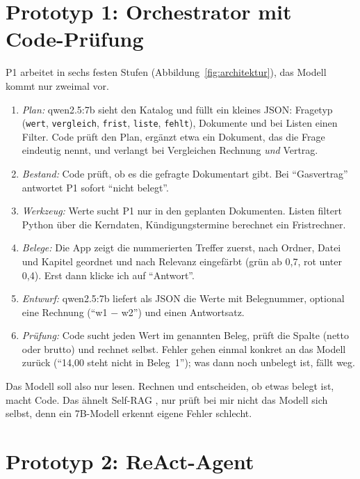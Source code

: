 \section{Prototyp 1: Orchestrator mit Code-Prüfung}
\label{sec:p1}

P1 arbeitet in sechs festen Stufen (Abbildung~\ref{fig:architektur}), das Modell kommt nur zweimal vor.

\begin{enumerate}[nosep, leftmargin=*]
    \item \emph{Plan:} qwen2.5:7b sieht den Katalog und füllt ein kleines JSON: Fragetyp (\texttt{wert}, \texttt{vergleich}, \texttt{frist}, \texttt{liste}, \texttt{fehlt}), Dokumente und bei Listen einen Filter. Code prüft den Plan, ergänzt etwa ein Dokument, das die Frage eindeutig nennt, und verlangt bei Vergleichen Rechnung \emph{und} Vertrag.
    \item \emph{Bestand:} Code prüft, ob es die gefragte Dokumentart gibt. Bei \enquote{Gasvertrag} antwortet P1 sofort \enquote{nicht belegt}.
    \item \emph{Werkzeug:} Werte sucht P1 nur in den geplanten Dokumenten. Listen filtert Python über die Kerndaten, Kündigungstermine berechnet ein Fristrechner.
    \item \emph{Belege:} Die App zeigt die nummerierten Treffer zuerst, nach Ordner, Datei und Kapitel geordnet und nach Relevanz eingefärbt (grün ab 0,7, rot unter 0,4). Erst dann klicke ich auf \enquote{Antwort}.
    \item \emph{Entwurf:} qwen2.5:7b liefert als JSON die Werte mit Belegnummer, optional eine Rechnung (\enquote{w1 $-$ w2}) und einen Antwortsatz.
    \item \emph{Prüfung:} Code sucht jeden Wert im genannten Beleg, prüft die Spalte (netto oder brutto) und rechnet selbst. Fehler gehen einmal konkret an das Modell zurück (\enquote{14,00 steht nicht in Beleg~1}); was dann noch unbelegt ist, fällt weg.
\end{enumerate}

Das Modell soll also nur lesen. Rechnen und entscheiden, ob etwas belegt ist, macht Code. Das ähnelt Self-RAG \cite{asai2024}, nur prüft bei mir nicht das Modell sich selbst, denn ein 7B-Modell erkennt eigene Fehler schlecht.

\section{Prototyp 2: ReAct-Agent}

